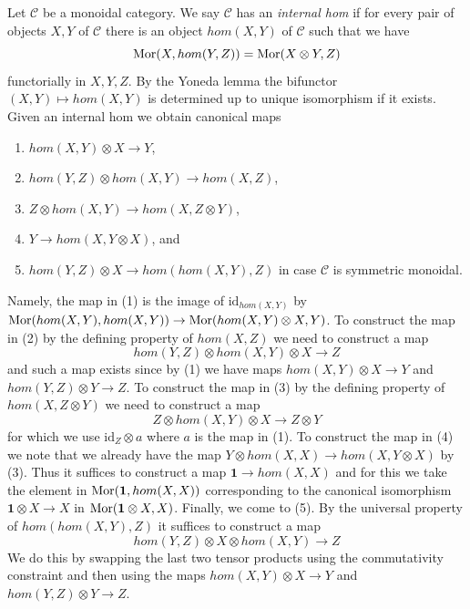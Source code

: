 \begin{remark}
\label{remark-internal-hom-monoidal}
Let $\mathcal{C}$ be a monoidal category. We say $\mathcal{C}$ has
an {\it internal hom} if for every pair of objects $X, Y$ of $\mathcal{C}$
there is an object $hom(X, Y)$ of $\mathcal{C}$ such that we have
$$
\mathop{\mathrm{Mor}}\nolimits(X, hom(Y, Z)) = \mathop{\mathrm{Mor}}\nolimits(X \otimes Y, Z)
$$
functorially in $X, Y, Z$. By the Yoneda lemma the bifunctor
$(X, Y) \mapsto hom(X, Y)$ is determined up to unique isomorphism
if it exists. Given an internal hom we obtain canonical maps
\begin{enumerate}
\item $hom(X, Y) \otimes X \to Y$,
\item $hom(Y, Z) \otimes hom(X, Y) \to hom(X, Z)$,
\item $Z \otimes hom(X, Y) \to hom(X, Z \otimes Y)$,
\item $Y \to hom(X, Y \otimes X)$, and
\item $hom(Y, Z) \otimes X \to hom(hom(X, Y), Z)$ in case
$\mathcal{C}$ is symmetric monoidal.
\end{enumerate}
Namely, the map in (1) is the image of $\text{id}_{hom(X, Y)}$
by $\mathop{\mathrm{Mor}}\nolimits(hom(X, Y), hom(X, Y)) \to \mathop{\mathrm{Mor}}\nolimits(hom(X, Y) \otimes X, Y)$.
To construct the map in (2) by the defining property of $hom(X, Z)$
we need to construct a map
$$
hom(Y, Z) \otimes hom(X, Y) \otimes X \longrightarrow Z
$$
and such a map exists since by (1) we have
maps $hom(X, Y) \otimes X \to Y$ and $hom(Y, Z) \otimes Y \to Z$.
To construct the map in (3) by the defining property of $hom(X, Z \otimes Y)$
we need to construct a map
$$
Z \otimes hom(X, Y) \otimes X \to Z \otimes Y
$$
for which we use $\text{id}_Z \otimes a$ where
$a$ is the map in (1). To construct the map in (4)
we note that we already have the map
$Y \otimes hom(X, X) \to hom(X, Y \otimes X)$ by (3).
Thus it suffices to construct a map $\mathbf{1} \to hom(X, X)$
and for this we take the element in $\mathop{\mathrm{Mor}}\nolimits(\mathbf{1}, hom(X, X))$
corresponding to the canonical isomorphism $\mathbf{1} \otimes X \to X$
in $\mathop{\mathrm{Mor}}\nolimits(\mathbf{1} \otimes X, X)$.
Finally, we come to (5). By the universal property of
$hom(hom(X, Y), Z)$ it suffices to construct a map
$$
hom(Y, Z) \otimes X \otimes hom(X, Y) \longrightarrow Z
$$
We do this by swapping the last two tensor products using the
commutativity constraint and then using the maps
$hom(X, Y) \otimes X \to Y$ and $hom(Y, Z) \otimes Y \to Z$.
\end{remark}





